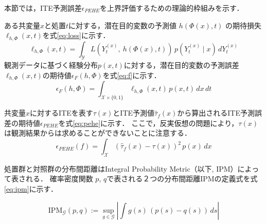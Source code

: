 \documentclass[dvipdfmx]{jreport}
\begin{document}
本節では，ITE予測誤差$\epsilon_{PEHE}$を上界評価するための理論的枠組みを示す．

ある共変量$x$と処置$t$に対する，潜在目的変数の予測値 $h(\Phi(x), t)$ の期待損失$\ell_{h,\Phi}(x, t)$を式\eqref{eq:loss}に示す．
\begin{equation}
    \ell_{h,\Phi}(x, t) = \int_{\mathcal{Y}} L(Y_t^{(x)},\ h(\Phi(x), t)) \, p(Y_t^{(x)} \mid x) \, dY_t^{(x)} \label{eq:loss}
\end{equation}
観測データに基づく経験分布$p(x,t)$に対する，潜在目的変数の予測誤差$\ell_{h,\Phi}(x, t)$の期待値$\epsilon_F(h, \Phi)$を式\eqref{eq:f}に示す．
\begin{equation}
    \epsilon_F(h, \Phi) = \int_{\mathcal{X} \times \{0,1\}} \ell_{h, \Phi}(x, t) \, p(x, t) \, dx \, dt \label{eq:f}
\end{equation}

共変量$x$に対するITEを表す$\tau(x)$とITE予測値$\hat{\tau}_f(x)$から算出されるITE予測誤差の期待値$\epsilon_{PEHE}$を式\eqref{eq:pehe}に示す．
ここで，反実仮想の問題により，$\tau(x)$は観測結果からは求めることができないことに注意する．
\begin{equation}
    \epsilon_{PEHE}(f) = \int_{\mathcal{X}} \left( \hat{\tau}_f(x) - \tau(x) \right)^2 \, p(x) \, dx \label{eq:pehe}
\end{equation}

処置群と対照群の分布間距離はIntegral Probability Metric（以下, IPM）によって表される．
確率密度関数 $p$, $q$で表される２つの分布間距離IPMの定義式を式\eqref{eq:ipm}に示す．

\begin{equation}
    \mathrm{IPM}_{\mathcal{G}}(p, q) := \sup_{g \in \mathcal{G}} \left| \int g(s)\, (p(s) - q(s))\, ds \right| \label{eq:ipm}
\end{equation}
\end{document}
